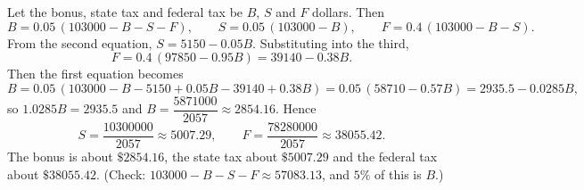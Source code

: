 Let the bonus, state tax and federal tax be $B$, $S$ and $F$ dollars. Then
\[B=0.05\,(103000-B-S-F),\qquad S=0.05\,(103000-B),\qquad F=0.4\,(103000-B-S).\]
From the second equation, $S=5150-0.05B$. Substituting into the third,
\[F=0.4\,(97850-0.95B)=39140-0.38B.\]
Then the first equation becomes
\[B=0.05\,(103000-B-5150+0.05B-39140+0.38B)=0.05\,(58710-0.57B)=2935.5-0.0285B,\]
so $1.0285B=2935.5$ and $B=\dfrac{5871000}{2057}\approx2854.16$. Hence
\[S=\dfrac{10300000}{2057}\approx5007.29,\qquad F=\dfrac{78280000}{2057}\approx38055.42.\]
The bonus is about $\boxed{\$2854.16}$, the state tax about $\boxed{\$5007.29}$ and the federal tax about $\boxed{\$38055.42}$. (Check: $103000-B-S-F\approx57083.13$, and $5\%$ of this is $B$.)
